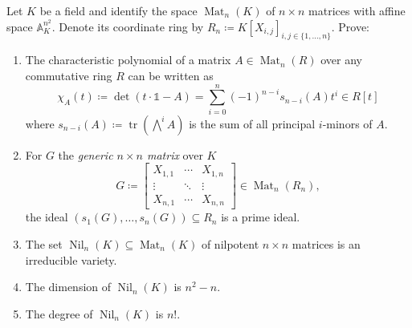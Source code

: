 \documentclass{exercises}
\DeclareMathOperator{\Mat}{Mat}
\DeclareMathOperator{\Nil}{Nil}
\DeclareMathOperator{\tr}{tr}
\begin{document}
\begin{exercise}
  Let $K$ be a field and identify the space $\Mat_n(K)$ of $n × n$ matrices with affine space $𝔸^{n^2}_K$.
  Denote its coordinate ring by $R_n \coloneqq K[X_{i,j}]_{i,j ∈ \{1,\dots,n\}}$.
  Prove:
  \begin{enumerate}
    \item The characteristic polynomial of a matrix $A ∈ \Mat_n(R)$ over any commutative ring $R$ can be written as
      $$
      χ_A(t) \coloneqq \det(t⋅𝟙 - A) = \sum_{i = 0}^n (-1)^{n-i}s_{n-i}(A)t^i ∈ R[t]
      $$
      where $s_{n-i}(A) \coloneqq \tr(⋀^iA)$ is the sum of all principal $i$-minors of $A$.
    \item For $G$ the \emph{generic $n × n$ matrix} over $K$
      $$
      G \coloneqq
      \begin{bmatrix}
        X_{1,1} & \cdots & X_{1,n}\\[0.3em]
        \vdots & \ddots & \vdots\\[0.3em]
        X_{n,1} & \cdots & X_{n,n}
      \end{bmatrix}
      ∈ \Mat_n(R_n),
      $$
      the ideal $(s_1(G),\dots,s_n(G))⊆R_n$ is a prime ideal.
    \item The set $\Nil_n(K)⊆\Mat_n(K)$ of nilpotent $n × n$ matrices is an irreducible variety.
    \item The dimension of $\Nil_n(K)$ is $n^2 - n$.
    \item The degree of $\Nil_n(K)$ is $n!$.
  \end{enumerate}
\end{exercise}
\end{document}
